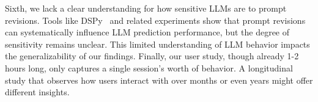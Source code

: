 Sixth, we lack a clear understanding %
for how sensitive LLMs are to prompt revisions. 
Tools like DSPy~\cite{khattab2023dspy} and related experiments show that prompt revisions can systematically influence LLM prediction performance, but the degree of sensitivity remains unclear.
This limited understanding of LLM behavior impacts the generalizability of our findings.
Finally, our user study, though already 1-2 hours long, only captures a single session's worth of behavior. 
A longitudinal study that observes how users interact with \system over months or even years might offer different insights.




